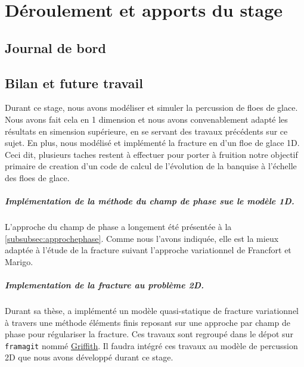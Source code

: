 
\chapter{Déroulement et apports du stage} %

\label{Chapter5} %







\section{Journal de bord}












\section{Bilan et future travail}

Durant ce stage, nous avons modéliser et simuler la percussion de floes de glace. Nous avons fait cela en 1 dimension et nous avons convenablement adapté les résultats en simension supérieure, en se servant des travaux précédents sur ce sujet. En plus, nous modélisé et implémenté la fracture en d'un floe de glace 1D. Ceci dit, plusieurs taches restent à effectuer pour porter à fruition notre objectif primaire de creation d'un code de calcul de l’évolution de la banquise à l’échelle des floes de glace.

\paragraph{Implémentation de la méthode du champ de phase sue le modèle 1D.} L'approche du champ de phase a longement été présentée à la \cref{subsubsec:approchephase}. Comme nous l'avons indiquée, elle est la mieux adaptée à l'étude de la fracture suivant l'approche variationnel de Francfort et Marigo.

\paragraph{Implementation de la fracture au problème 2D.} Durant sa thèse, \citeauthor{balasoiu2020halthesis} a implémenté un modèle quasi-statique de fracture variationnel à travers une méthode éléments finis reposant sur une approche par champ de phase pour régulariser la fracture. Ces travaux sont regroupé dans le dépot sur \texttt{framagit} nommé \href{https://framagit.org/RaK/Griffith}{Griffith}. Il faudra intégré ces travaux au modèle de percussion 2D que nous avons développé durant ce stage.

